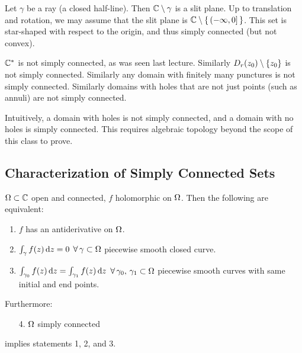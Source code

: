 \begin{example}
Let $\gamma$ be a ray (a closed half-line).
Then $\mathbb{C} \setminus \gamma$ is a slit plane. Up to translation and rotation, we may assume that the slit plane is $\mathbb{C} \setminus \set{(-\infty , 0] }$. This set is star-shaped with respect to the origin, and thus simply connected (but not convex).

\end{example}


\begin{counterexample}
$\mathbb{C}^*$ is not simply connected, as was seen last lecture. Similarly $D_r (z_0) \setminus \{ z_0 \}$ is not simply connected. Similarly any domain with finitely many punctures is not simply connected. Similarly domains with holes that are not just points (such as annuli) are not simply connected.
\end{counterexample}

\begin{note}
Intuitively, a domain with holes is not simply connected, and a domain with no holes is simply connected. This requires algebraic topology beyond the scope of this class to prove.
\end{note}

\subsection{Characterization of Simply Connected Sets}
\begin{theorem}\label{thm:char-simp-conn}
$\Omega \subset \mathbb{C}$ open and connected, $f$ holomorphic on $\Omega$. Then the following are equivalent:
\begin{enumerate}
    \item $f$ has an antiderivative on $\Omega$.
    \item $\int_\gamma f(z) \dif z = 0$ $\forall \, \gamma \subset \Omega$ piecewise smooth closed curve.
    \item $\int_{\gamma_0} f(z) \dif z = \int_{\gamma_1} f(z) \dif z$ $\forall \, \gamma_0, \, \gamma_1 \subset \Omega$ piecewise smooth curves with same initial and end points.
\end{enumerate}

Furthermore:
\begin{enumerate}
    \item[4.] $\Omega$ simply connected
\end{enumerate}
implies statements 1, 2, and 3.

\end{theorem}

